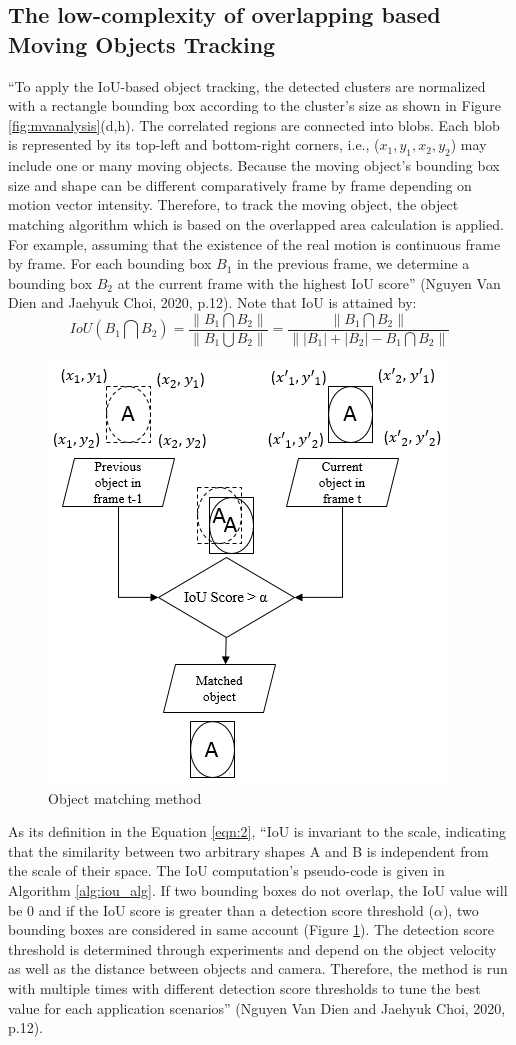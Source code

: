 \subsection{The low-complexity of overlapping based Moving Objects Tracking}
\label{subsec:1}
“To apply the IoU-based object tracking, the detected clusters are normalized with a rectangle bounding box according to the cluster's size as shown in Figure \ref{fig:mvanalysis}(d,h). The correlated regions are connected into blobs. Each blob is represented by its top-left and bottom-right corners, i.e.,  ($x_{1}, y_{1}, x_{2}, y_{2}$) may include one or many moving objects. Because the moving object's bounding box size and shape can be different comparatively frame by frame depending on motion vector intensity. Therefore, to track the moving object, the object matching algorithm which is based on the overlapped area calculation is applied. For example,  assuming that the existence of the real motion is continuous frame by frame. For each bounding box $B_{1}$ in the previous frame, we determine a bounding box $B_{2}$ at the current frame with the highest IoU score” (Nguyen Van Dien and Jaehyuk Choi, 2020, p.12). Note that IoU is attained by:\\
\begin{equation}
\label{eqn:2}
IoU(B_{1}\bigcap B_{2}) = \frac{\left \| B_{1}\bigcap B_{2} \right \|}{\left \| B_{1}\bigcup B_{2}  \right \|} =  \frac{\left \| B_{1}\bigcap B_{2} \right \|}{\left \| \left | B_{1} \right |  +  \left | B_{2} \right |  - B_{1}\bigcap B_{2} \right \|}
\end{equation} 
\begin{figure}
\centering
 \includegraphics[width=0.4\linewidth]{Figures/iou.png}
 \caption{Object matching method}
 \label{fig:iou}
\end{figure}
 As its definition in the Equation \ref{eqn:2}, “IoU is invariant to the scale, indicating that the similarity between two arbitrary shapes A and B is independent from the scale of their space. The IoU computation’s pseudo-code is given in Algorithm \ref{alg:iou_alg}. If two bounding boxes do not overlap, the IoU value will be 0 and if the IoU score is greater than a detection score threshold ($\alpha$), two bounding boxes are considered in same account (Figure \ref{fig:iou}). The detection score threshold is determined through experiments and depend on the object velocity as well as the distance between objects and camera. Therefore, the method is run with multiple times with different detection score thresholds to tune the best value for each application scenarios” (Nguyen Van Dien and Jaehyuk Choi, 2020, p.12). 
